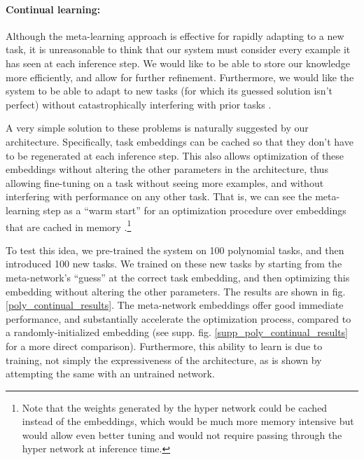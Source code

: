 \documentclass{article}
\begin{document}
\paragraph{Continual learning:} Although the meta-learning approach is effective for rapidly adapting to a new task, it is unreasonable to think that our system must consider every example it has seen at each inference step. We would like to be able to store our knowledge more efficiently, and allow for further refinement. Furthermore, we would like the system to be able to adapt to new tasks (for which its guessed solution isn't perfect) without catastrophically interfering with prior tasks \citep{McCloskey1989}. \par
A very simple solution to these problems is naturally suggested by our architecture. Specifically, task embeddings can be cached so that they don't have to be regenerated at each inference step. This also allows optimization of these embeddings without altering the other parameters in the architecture, thus allowing fine-tuning on a task without seeing more examples, and without interfering with performance on any other task. That is, we can see the meta-learning step as a ``warm start'' for an optimization procedure over embeddings that are cached in memory \citep[c.f.][]{Kumaran2016}.\footnote{Note that the weights generated by the hyper network could be cached instead of the embeddings, which would be much more memory intensive but would allow even better tuning and would not require passing through the hyper network at inference time.} \par 
To test this idea, we pre-trained the system on 100 polynomial tasks, and then introduced 100 new tasks. We trained on these new tasks by starting from the meta-network's ``guess'' at the correct task embedding, and then optimizing this embedding without altering the other parameters. The results are shown in fig. \ref{poly_continual_results}. The meta-network embeddings offer good immediate performance, and substantially accelerate the optimization process, compared to a randomly-initialized embedding (see supp. fig. \ref{supp_poly_continual_results} for a more direct comparison). Furthermore, this ability to learn is due to training, not simply the expressiveness of the architecture, as is shown by attempting the same with an untrained network. \par 
\end{document}
